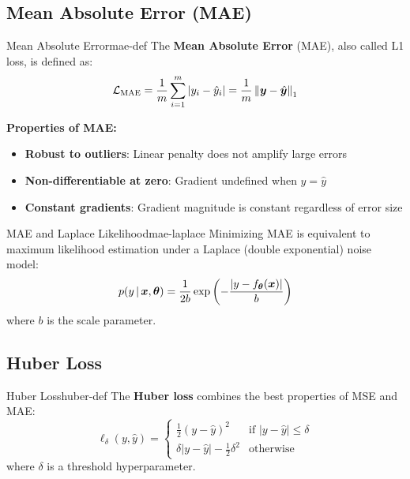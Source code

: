 \documentclass[../../main.tex]{subfiles}
\begin{document}
\subsection{Mean Absolute Error (MAE)}

\begin{definition}{Mean Absolute Error}{mae-def}
The \textbf{Mean Absolute Error} (MAE), also called L1 loss, is defined as:
\[
    \mathcal{L}_{\text{MAE}} = \frac{1}{m} \sum_{i=1}^{m} |y_i - \hat{y}_i| = \frac{1}{m} \left\lVert \boldsymbol{y} - \hat{\boldsymbol{y}} \right\rVert_1
\]
\end{definition}

\textbf{Properties of MAE:}
\begin{itemize}
    \item \textbf{Robust to outliers}: Linear penalty does not amplify large errors
    \item \textbf{Non-differentiable at zero}: Gradient undefined when $y = \hat{y}$
    \item \textbf{Constant gradients}: Gradient magnitude is constant regardless of error size
\end{itemize}

\begin{theorem}{MAE and Laplace Likelihood}{mae-laplace}
Minimizing MAE is equivalent to maximum likelihood estimation under a Laplace (double exponential) noise model:
\[
    p(y \,|\, \boldsymbol{x}, \boldsymbol{\theta}) = \frac{1}{2b} \exp\left(-\frac{|y - f_{\boldsymbol{\theta}}(\boldsymbol{x})|}{b}\right)
\]
where $b$ is the scale parameter.
\end{theorem}

\subsection{Huber Loss}

\begin{definition}{Huber Loss}{huber-def}
The \textbf{Huber loss} combines the best properties of MSE and MAE:
\[
    \ell_\delta(y, \hat{y}) = \begin{cases}
        \frac{1}{2}(y - \hat{y})^2 & \text{if } |y - \hat{y}| \leq \delta \\[4pt]
        \delta |y - \hat{y}| - \frac{1}{2}\delta^2 & \text{otherwise}
    \end{cases}
\]
where $\delta$ is a threshold hyperparameter.
\end{definition}
\end{document}
